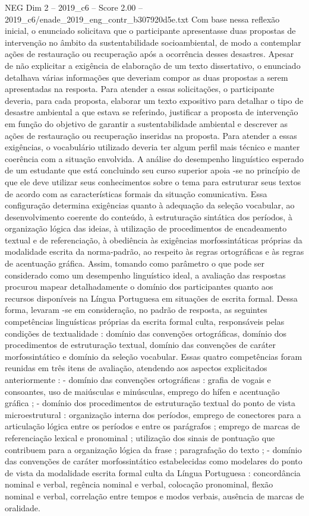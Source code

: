 \begin{textsample}{NEG Dim 2 – 2019\_c6 – Score 2.00 – 2019\_c6/enade\_2019\_eng\_contr\_b307920d5e.txt}
Com base nessa reflexão inicial, o enunciado solicitava que o participante apresentasse duas propostas de intervenção no âmbito da sustentabilidade socioambiental, de modo a contemplar ações de restauração ou recuperação após a ocorrência desses desastres.
Apesar de não explicitar a exigência de elaboração de um texto dissertativo, o enunciado detalhava várias informações que deveriam compor as duas propostas a serem apresentadas na resposta.
Para atender a essas solicitações, o participante deveria, para cada proposta, elaborar um texto expositivo para detalhar o tipo de desastre ambiental a que estava se referindo, justificar a proposta de intervenção em função do objetivo de garantir a sustentabilidade ambiental e descrever as ações de restauração ou recuperação inseridas na proposta.
Para atender a essas exigências, o vocabulário utilizado deveria ter algum perfil mais técnico e manter coerência com a situação envolvida.
A análise do desempenho linguístico esperado de um estudante que está concluindo seu curso superior apoia -se no princípio de que ele deve utilizar seus conhecimentos sobre o tema para estruturar seus textos de acordo com as características formais da situação comunicativa.
Essa configuração determina exigências quanto à adequação da seleção vocabular, ao desenvolvimento coerente do conteúdo, à estruturação sintática dos períodos, à organização lógica das ideias, à utilização de procedimentos de encadeamento textual e de referenciação, à obediência às exigências morfossintáticas próprias da modalidade escrita da norma-padrão, ao respeito às regras ortográficas e às regras de acentuação gráfica.
Assim, tomando como parâmetro o que pode ser considerado como um desempenho linguístico ideal, a avaliação das respostas procurou mapear detalhadamente o domínio dos participantes quanto aos recursos disponíveis na Língua Portuguesa em situações de escrita formal.
Dessa forma, levaram -se em consideração, no padrão de resposta, as seguintes competências linguísticas próprias da escrita formal culta, responsáveis pelas condições de textualidade : domínio das convenções ortográficas, domínio dos procedimentos de estruturação textual, domínio das convenções de caráter morfossintático e domínio da seleção vocabular.
Essas quatro competências foram reunidas em três itens de avaliação, atendendo aos aspectos explicitados anteriormente : - domínio das convenções ortográficas : grafia de vogais e consoantes, uso de maiúsculas e minúsculas, emprego do hífen e acentuação gráfica ; - domínio dos procedimentos de estruturação textual do ponto de vista microestrutural : organização interna dos períodos, emprego de conectores para a articulação lógica entre os períodos e entre os parágrafos ; emprego de marcas de referenciação lexical e pronominal ; utilização dos sinais de pontuação que contribuem para a organização lógica da frase ; paragrafação do texto ; - domínio das convenções de caráter morfossintático estabelecidas como modelares do ponto de vista da modalidade escrita formal culta da Língua Portuguesa : concordância nominal e verbal, regência nominal e verbal, colocação pronominal, flexão nominal e verbal, correlação entre tempos e modos verbais, ausência de marcas de oralidade.

\end{textsample}
